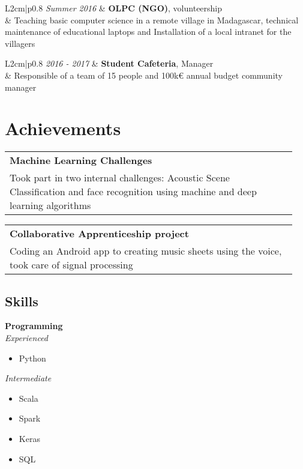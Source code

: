 \documentclass[a4paper,10.5pt]{article}
\begin{document}
\begin{paracol}{2}
\begin{leftcolumn}
			\begin{tabular}{L{2cm}|p{0.8\linewidth}}
				\textit{Summer 2016} & \textbf{OLPC (NGO)}, volunteership \\
				& Teaching basic computer science in a remote village in Madagascar, technical maintenance of educational laptops and Installation of a local intranet for the villagers
			\end{tabular}
			
			\begin{tabular}{L{2cm}|p{0.8\linewidth}}
				\textit{2016 - 2017} & \textbf{Student Cafeteria}, Manager \\
				& Responsible of a team of 15 people and 100k€ annual budget community manager
			\end{tabular}
					
			\vspace{0.2cm}
			
			\section*{Achievements}
			\begin{tabular}{|p{0.95\linewidth} }
				\textbf{Machine Learning Challenges} \\
				Took part in two internal challenges: Acoustic Scene Classification and face recognition using machine and deep learning algorithms
			\end{tabular}
		
			\begin{tabular}{|p{0.95\linewidth} }
				\textbf{Collaborative Apprenticeship project} \\
				Coding an Android app to creating music sheets using the voice, took care of signal processing 
			\end{tabular}
			
			
			\end{leftcolumn}
	
		\begin{rightcolumn}
			\section*{Skills}
			\textbf{Programming}  \\
			\textit{Experienced}
			\begin{itemize}
				\item Python
			\end{itemize}
			\textit{Intermediate}
			\begin{itemize}
				\item Scala
				\item Spark
				\item Keras
				\item SQL				
			\end{itemize}
			\vspace{0.2cm}
			

\end{rightcolumn}
\end{paracol}
\end{document}

